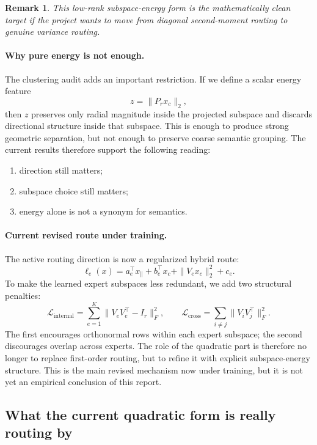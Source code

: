 \documentclass[11pt]{article}
\newtheorem{remark}{Remark}
\begin{document}
\begin{remark}
This low-rank subspace-energy form is the mathematically clean target if the project wants to move from diagonal second-moment routing to genuine variance routing.
\end{remark}

\paragraph{Why pure energy is not enough.}
The clustering audit adds an important restriction. If we define a scalar energy feature
\[
z=\|P_r x_c\|_2,
\]
then $z$ preserves only radial magnitude inside the projected subspace and discards directional structure inside that subspace. This is enough to produce strong geometric separation, but not enough to preserve coarse semantic grouping. The current results therefore support the following reading:
\begin{enumerate}
    \item direction still matters;
    \item subspace choice still matters;
    \item energy alone is not a synonym for semantics.
\end{enumerate}

\paragraph{Current revised route under training.}
The active routing direction is now a regularized hybrid route:
\[
\ell_e(x)
=
a_e^\top x_{\parallel}
+
b_e^\top x_c
+
\|V_e x_c\|_2^2
+
c_e.
\]
To make the learned expert subspaces less redundant, we add two structural penalties:
\[
\mathcal{L}_{\mathrm{internal}}
=
\sum_{e=1}^{K}\|V_eV_e^\top-I_r\|_F^2,
\qquad
\mathcal{L}_{\mathrm{cross}}
=
\sum_{i\neq j}\|V_iV_j^\top\|_F^2.
\]
The first encourages orthonormal rows within each expert subspace; the second discourages overlap across experts. The role of the quadratic part is therefore no longer to replace first-order routing, but to refine it with explicit subspace-energy structure. This is the main revised mechanism now under training, but it is not yet an empirical conclusion of this report.

\subsection{What the current quadratic form is really routing by}
\end{document}
